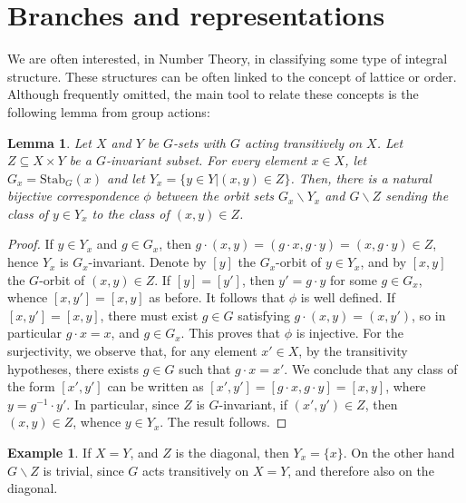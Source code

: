 \documentclass{article}
\newtheorem{Lem}[Prop]{Lemma}
\theoremstyle{definition}
\newtheorem{ex}[Prop]{Example}
\theoremstyle{remark}
\begin{document}
\section{Branches and representations}\label{S4B}

We are often interested, in Number Theory, 
in classifying some type of  integral structure. 
These structures can be often linked to the concept 
of lattice or order. Although frequently omitted, 
the main tool to relate these concepts is
the following lemma from group actions:

\begin{Lem}\label{mainlem}
    Let $X$ and $Y$ be $G$-sets with $G$ acting transitively on $X$. 
    Let $Z\subseteq X\times Y$
    be a $G$-invariant subset. For every element $x\in X$, let $G_x=\mathrm{Stab}_G(x)$
    and let $Y_x=\{y\in Y|(x,y)\in Z\}$. Then, there is a natural bijective correspondence $\phi$
    between the orbit sets $G_x\backslash Y_x$ and $G\backslash Z$ sending the class 
    of $y\in Y_x$ to the class of $(x,y)\in Z$.
\end{Lem}

\begin{proof}
    If $y\in Y_x$ and $g\in G_x$, then 
    $g \cdot (x,y)=(g \cdot x , g \cdot y )=(x,g \cdot y)\in Z$, 
    hence $Y_x$ is $G_x$-invariant.
    Denote by $[y]$ the $G_x$-orbit of $y\in Y_x$, 
    and by $[x,y]$ the $G$-orbit of 
    $(x,y)\in Z$. If $[y]=[y']$, then $y'=g\cdot y$ for 
    some $g\in G_x$, whence $[x,y']=[x,y]$
    as before. It follows that $\phi$ is well defined. 
    If $[x,y']=[x,y]$, there must exist
    $g\in G$ satisfying $g\cdot (x,y)=(x,y')$, 
    so in particular $g\cdot x=x$, and $g\in G_x$. This
    proves that $\phi$ is injective. For the surjectivity, 
    we observe that, for any element
    $x'\in X$, by the transitivity hypotheses, 
    there exists $g\in G$ such that $g\cdot x=x'$.
    We conclude that any class of the form $[x',y']$ 
    can be written as $[x',y']=
    [g\cdot x,g\cdot y]=[x,y]$, where $y=g^{-1}\cdot y'$.
    In particular, since $Z$ is $G$-invariant, if $(x',y')\in Z$, then
    $(x,y)\in Z$, whence $y\in Y_x$. The result follows.
\end{proof}

\begin{ex}
    If $X=Y$, and $Z$ is the diagonal, then $Y_x=\{x\}$. On the other hand
    $G\backslash Z$ is trivial, since $G$ acts transitively on $X=Y$,
    and therefore also on the diagonal.
\end{ex}
\end{document}
